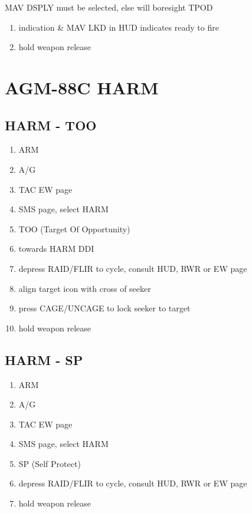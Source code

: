 \documentclass[fontInter]{TechCheck}
\begin{document}
	 MAV DSPLY must be selected, else will boresight TPOD
	\begin{enumerate}[resume]
	\item {}\dotfill indication \& MAV LKD in HUD indicates ready to fire
	\item {}\dotfill hold weapon release
	\end{enumerate}

	\clearpage

	\section{AGM-88C HARM}

	\subsection{HARM - TOO}
	\begin{enumerate}
		\item {}\dotfill ARM
		\item {}\dotfill A/G
		\item {}\dotfill TAC EW page
		\item {}\dotfill SMS page, select HARM
		\item {}\dotfill TOO (Target Of Opportunity)
		\item {}\dotfill towards HARM DDI
		\item {}\dotfill depress RAID/FLIR to cycle, consult HUD, RWR or EW page
		\item {}\dotfill align target icon with cross of seeker
		\item {}\dotfill press CAGE/UNCAGE to lock seeker to target
		\item {}\dotfill hold weapon release
	\end{enumerate}

	\subsection{HARM - SP}
	\begin{enumerate}
		\item {}\dotfill ARM
		\item {}\dotfill A/G
		\item {}\dotfill TAC EW page
		\item {}\dotfill SMS page, select HARM
		\item {}\dotfill SP (Self Protect)
		\item {}\dotfill depress RAID/FLIR to cycle, consult HUD, RWR or EW page
		\item {}\dotfill hold weapon release
	\end{enumerate}
\end{document}
